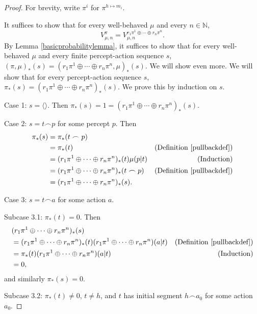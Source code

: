 \documentclass[runningheads]{llncs}
\begin{document}
\begin{proof}
    For brevity, write $\pi^i$ for $\pi^{h\mapsto m_i}$.

    It suffices to show that for every well-behaved $\mu$ and every $n\in\mathbb N$,
    \[
        V^{\pi}_{\mu,n}
        =
        V^{r_1\pi^1 \oplus \cdots \oplus r_n\pi^n}_{\mu,n}.
    \]
    By Lemma \ref{basicprobabilitylemma}, it suffices to show that for every
    well-behaved $\mu$ and every finite percept-action sequence $s$,
    $
    (\pi,\mu)_*(s)
    =
    (r_1\pi^1 \oplus \cdots \oplus r_n\pi^n,\mu)_*(s)
    $.
    We will show even more. We will show that for every percept-action sequence
    $s$, $\pi_*(s)=(r_1\pi^1 \oplus \cdots \oplus r_n\pi^n)_*(s)$.
    We prove this by induction on $s$.

    Case 1: $s=\langle\rangle$.
    Then $\pi_*(s)=1
    =(r_1\pi^1 \oplus \cdots \oplus r_n\pi^n)_*(s)$.

    Case 2: $s=t\frown p$ for some percept $p$.
    Then
    \begin{align*}
        \pi_*(s)
            &= \pi_*(t\frown p)\\
            &= \pi_*(t)
                &\mbox{(Definition \ref{pullbackdef})}\\
            &= (r_1\pi^1 \oplus \cdots \oplus r_n\pi^n)_*(t)\mu(p|t)
                &\mbox{(Induction)}\\
            &= (r_1\pi^1 \oplus \cdots \oplus r_n\pi^n)_*(t\frown p)
                &\mbox{(Definition \ref{pullbackdef})}\\
            &= (r_1\pi^1 \oplus \cdots \oplus r_n\pi^n)_*(s).
    \end{align*}

    Case 3: $s=t\frown a$ for some action $a$.

    Subcase 3.1: $\pi_*(t)=0$.
    Then
    \begin{align*}
        &{} (r_1\pi^1\oplus\cdots\oplus r_n\pi^n)_*(s)\\
            &= (r_1\pi^1\oplus\cdots\oplus r_n\pi^n)_*(t)
            (r_1\pi^1\oplus\cdots\oplus r_n\pi^n)(a|t)
                &\mbox{(Definition \ref{pullbackdef})}\\
            &= \pi_*(t)(r_1\pi^1\oplus\cdots\oplus r_n\pi^n)(a|t)
                &\mbox{(Induction)}\\
            &= 0,
    \end{align*}
    and similarly $\pi_*(s)=0$.

    Subcase 3.2: $\pi_*(t)\not=0$, $t\not=h$, and
    $t$ has initial segment $h\frown a_0$ for some action $a_0$.


\end{proof}
\end{document}
